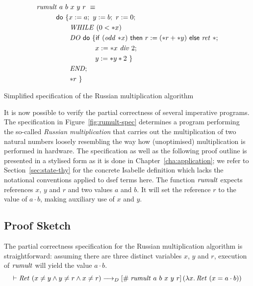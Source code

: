 \begin{myfigure}
  \centering
  \newcommand{\filla}{\hspace*{1cm}}
  \newcommand{\fillaa}{\hspace*{17mm}}
  \newcommand{\fillaaa}{\hspace*{3cm}}
  \newcommand{\assgn}{\;{:=}\;}
  \begin{align*}
    & \op{rumult}\ a\ b\ x\ y\ r\ \equiv\\
    & \filla \DO\ \{ x \assgn a;\ y \assgn b;\ r \assgn 0;\\
    & \fillaa       \op{WHILE}\ (0 < \rd{x})\\
    & \fillaa       \op{DO}\ \DO\ \{\If\ (\op{odd}\ \rd{x})\ \Then\ r\assgn (\rd{r} +
    \rd{y})\ \Else\ \ret\ \unit;\\
    & \fillaaa          x\assgn \rd{x}\ \op{div}\ 2;\\
    & \fillaaa          y\assgn \rd{y} * 2\ \}\\
    & \fillaa          \op{END};\\
    & \fillaa          \rd{r}\ \}
  \end{align*}
  \mylinesep
  \caption{Simplified specification of the Russian multiplication algorithm}
  \label{fig:rumult-spec}
\end{myfigure}

It is now possible to verify the partial correctness of several imperative
programs. The specification in Figure~\ref{fig:rumult-spec} determines a program
performing the so-called \emph{Russian multiplication} that carries out the
multiplication of two natural numbers loosely resembling the way how
(unoptimised) multiplication is performed in hardware. The specification as well
as the following proof outline is presented in a stylised form as it is done in
Chapter~\ref{cha:application}; we refer to Section~\ref{sec:state-thy} for the
concrete Isabelle definition which lacks the notational conventions applied to
dsef terms here. The function $\mathit{rumult}$ expects references $x$, $y$ and $r$
and two values $a$ and $b$. It will set the reference $r$ to the value of $a\cdot
b$, making auxiliary use of $x$ and $y$.


\subsection{Proof Sketch}
The partial correctness specification for the Russian multiplication algorithm
is straightforward: assuming there are three distinct variables $x$, $y$ and
$r$, execution of $\mathit{rumult}$ will yield the value $a\cdot b$.
\[
\vdash \mathit{Ret}\ (x\neq y \land y\neq r \land x\neq r) \longrightarrow_D [\#\;\mathit{rumult}\ a\ b\ x\ y\
  r]\,{({\lambda x.\,\mathit{Ret}\ (x = a\cdot b)})}
\]

